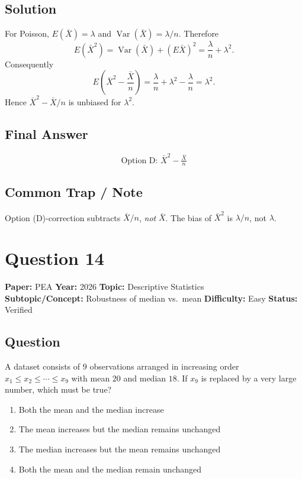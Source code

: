 \documentclass[11pt]{article}
\begin{document}
\subsection*{Solution}
For Poisson, $E(\bar{X}) = \lambda$ and $\operatorname{Var}(\bar{X}) = \lambda/n$. Therefore
\[
E(\bar{X}^2) = \operatorname{Var}(\bar{X}) + (E\bar{X})^2 = \frac{\lambda}{n} + \lambda^2.
\]
Consequently
\[
E\!\left(\bar{X}^2 - \frac{\bar{X}}{n}\right)
= \frac{\lambda}{n} + \lambda^2 - \frac{\lambda}{n}
= \lambda^2.
\]
Hence $\bar{X}^2 - \bar{X}/n$ is unbiased for $\lambda^2$.

\subsection*{Final Answer}
\[
\boxed{\text{Option D: } \bar{X}^2 - \tfrac{\bar{X}}{n}}
\]

\subsection*{Common Trap / Note}
Option (D)-correction subtracts $\bar X/n$, \emph{not} $\bar X$. The bias of $\bar X^2$ is $\lambda/n$, not $\lambda$.

\section*{Question 14}
\textbf{Paper:} PEA \quad \textbf{Year:} 2026 \quad \textbf{Topic:} Descriptive Statistics \\
\textbf{Subtopic/Concept:} Robustness of median vs.\ mean \quad
\textbf{Difficulty:} Easy \quad \textbf{Status:} Verified

\subsection*{Question}
A dataset consists of $9$ observations arranged in increasing order
$x_1 \le x_2 \le \cdots \le x_9$ with mean $20$ and median $18$. If $x_9$ is
replaced by a very large number, which must be true?
\begin{enumerate}[label=(\Alph*)]
\item Both the mean and the median increase
\item The mean increases but the median remains unchanged
\item The median increases but the mean remains unchanged
\item Both the mean and the median remain unchanged
\end{enumerate}
\end{document}
